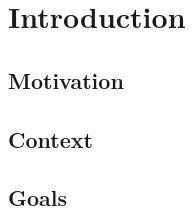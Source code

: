 

\chapter{Introduction}
\label{ch:introduction}

\section{Motivation}
\label{sec:introduction:motivation}

\kant[3-5]

\section{Context}
\label{sec:introduction:context}

\kant[6-8]

\section{Goals}
\label{sec:introduction:goals}

\kant[9-11]

